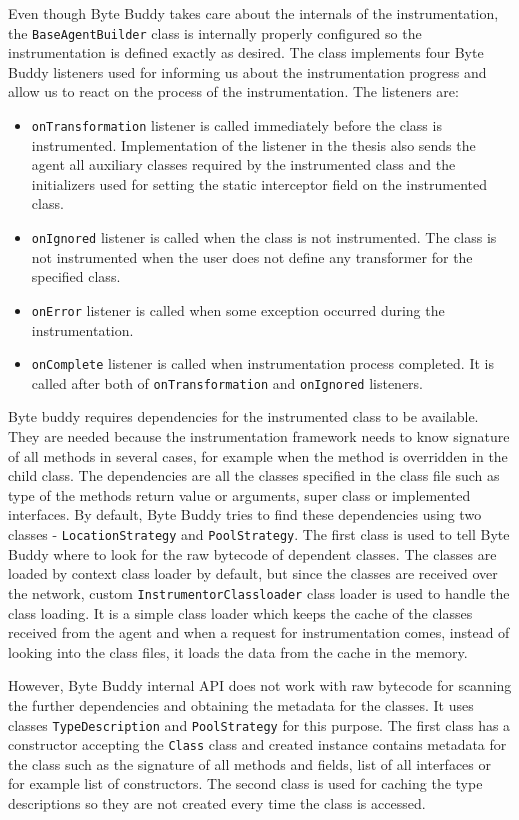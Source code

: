 Even though Byte Buddy takes care about the internals of the instrumentation, the \texttt{BaseAgentBuilder} class is internally properly configured so the instrumentation is defined exactly as desired. The class implements four Byte Buddy listeners used for informing us about the instrumentation progress and allow us to react on the process of the instrumentation. The listeners are:
\begin{itemize}
	\item \texttt{onTransformation} listener is called immediately before the class is instrumented.  Implementation of the listener in the thesis also sends the agent all auxiliary classes required by the instrumented class and the initializers used for setting the static interceptor field on the instrumented class.
	\item \texttt{onIgnored} listener is called when the class is not instrumented. The class is not instrumented when the user does not define any transformer for the specified class.
	\item \texttt{onError} listener is called when some exception occurred during the instrumentation.
	\item \texttt{onComplete} listener is called when instrumentation process completed. It is called after both of \texttt{onTransformation} and \texttt{onIgnored} listeners.
\end{itemize}

Byte buddy requires dependencies for the instrumented class to be available. They are needed because the instrumentation framework needs to know signature of all methods in several cases, for example when the method is overridden in the child class. The dependencies are all the classes specified in the class file such as type of the methods return value or arguments, super class or implemented interfaces. 
By default, Byte Buddy tries to find these dependencies using two classes - \texttt{LocationStrategy} and \texttt{PoolStrategy}. The first class is used to tell Byte Buddy where to look for the raw bytecode of dependent classes. The classes are loaded by context class loader by default, but since the classes are received over the network, custom \texttt{InstrumentorClassloader} class loader is used to handle the class loading. It is a simple class loader which keeps the cache of the classes received from the agent and when a request for instrumentation comes, instead of looking into the class files, it loads the data from the cache in the memory.

However, Byte Buddy internal API does not work with raw bytecode for scanning the further dependencies and obtaining the metadata for the classes. It uses classes \texttt{TypeDescription} and \texttt{PoolStrategy} for this purpose. The first class has a constructor accepting the \texttt{Class} class and created instance contains metadata for the class such as the signature of all methods and fields, list of all interfaces or for example list of constructors. The second class is used for caching the type descriptions so they are not created every time the class is accessed. 

